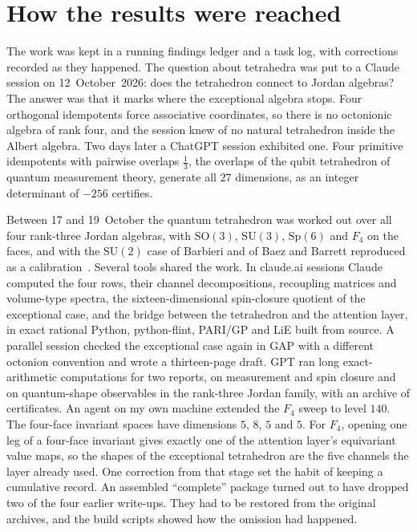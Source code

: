\section{How the results were reached}
\label{app:provenance}

The work was kept in a running findings ledger and a task log, with corrections recorded as
they happened. The question about tetrahedra was put to a Claude session on 12~October~2026:
does the tetrahedron connect to Jordan algebras? The answer was that it marks where the
exceptional algebra stops. Four orthogonal idempotents force associative coordinates, so
there is no octonionic algebra of rank four, and the session knew of no natural tetrahedron
inside the Albert algebra. Two days later a ChatGPT session exhibited one. Four primitive
idempotents with pairwise overlaps $\frac13$, the overlaps of the qubit tetrahedron of
quantum measurement theory, generate all $27$ dimensions, as an integer determinant of
$-256$ certifies.

Between 17 and 19~October the quantum tetrahedron was worked out over all four rank-three
Jordan algebras, with $\mathrm{SO}(3)$, $\mathrm{SU}(3)$, $\mathrm{Sp}(6)$ and $F_4$ on the
faces, and with the $\mathrm{SU}(2)$ case of Barbieri and of Baez and Barrett reproduced as a
calibration~\cite{Barbieri1998,BaezBarrett1999}. Several tools shared the work. In claude.ai
sessions Claude computed the four rows, their channel decompositions, recoupling matrices and
volume-type spectra, the sixteen-dimensional spin-closure quotient of the exceptional case,
and the bridge between the tetrahedron and the attention layer, in exact rational Python,
python-flint, PARI/GP and LiE built from source. A parallel session checked the exceptional
case again in GAP with a different octonion convention and wrote a thirteen-page draft. GPT
ran long exact-arithmetic computations for two reports, on measurement and spin closure and
on quantum-shape observables in the rank-three Jordan family, with an archive of
certificates. An agent on my own machine extended the $F_4$ sweep to level $140$. The
four-face invariant spaces have dimensions $5$, $8$, $5$ and $5$. For $F_4$, opening one leg
of a four-face invariant gives exactly one of the attention layer's equivariant value maps,
so the shapes of the exceptional tetrahedron are the five channels the layer already used.
One correction from that stage set the habit of keeping a cumulative record. An assembled
``complete'' package turned out to have dropped two of the four earlier write-ups. They had
to be restored from the original archives, and the build scripts showed how the omission had
happened.


